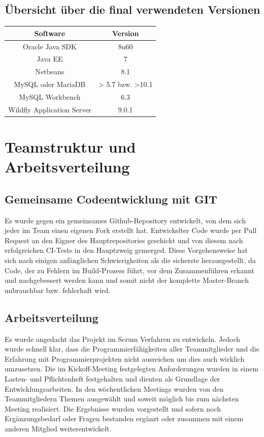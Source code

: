 \documentclass[12pt,a4paper,parskip]{scrreprt}
\begin{document}
\section{Übersicht über die final verwendeten Versionen}
\begin{center}
\begin{tabular}{|c|c|}
\hline
\rule[-1ex]{0pt}{2.5ex} Software & Version  \\ 
\hline 
\rule[-1ex]{0pt}{2.5ex} Oracle Java SDK & 8u60  \\ 
\hline 
\rule[-1ex]{0pt}{2.5ex} Java EE & 7 \\ 
\hline 
\rule[-1ex]{0pt}{2.5ex} Netbeans & 8.1 \\ 
\hline 
\rule[-1ex]{0pt}{2.5ex} MySQL oder MariaDB & > 5.7 bzw. >10.1 \\ 
\hline 
\rule[-1ex]{0pt}{2.5ex} MySQL Workbench & 6.3 \\ 
\hline
\rule[-1ex]{0pt}{2.5ex} Wildfly Application Server & 9.0.1 \\ 
\hline 
\end{tabular}
\end{center}
\chapter{Teamstruktur und Arbeitsverteilung}
\section{Gemeinsame Codeentwicklung mit GIT}
Es wurde gegen ein gemeinsames Github-Repository entwickelt, von dem sich jeder im Team einen eigenen Fork erstellt hat. Entwickelter Code wurde per Pull Request an den Eigner des Hauptrepositories geschickt und von diesem nach erfolgreichen CI-Tests in den Hauptzweig gemerged. Diese Vorgehensweise hat sich nach einigen anfänglichen Schwierigkeiten als die sicherste herausgestellt, da Code, der zu Fehlern im Build-Prozess führt, vor dem Zusammenführen erkannt und nachgebessert werden kann und somit nicht der komplette Master-Branch unbrauchbar bzw. fehlerhaft wird.
\section{Arbeitsverteilung}
Es wurde angedacht das Projekt im Scrum Verfahren zu entwickeln. Jedoch wurde schnell klar, dass die Programmierfähigkeiten aller Teammitglieder und die Erfahrung mit Programmierprojekten nicht ausreichen um dies auch wirklich umzusetzen.
Die im Kickoff-Meeting festgelegten Anforderungen wurden in einem Lasten- und Pflichtenheft festgehalten und dienten als Grundlage der Entwicklungsarbeiten. In den wöchentlichen Meetings wurden von den Teammitgliedern Themen ausgewählt und soweit möglich bis zum nächsten Meeting realisiert. Die Ergebnisse wurden vorgestellt und sofern noch Ergänzungsbedarf oder Fragen bestanden ergänzt oder zusammen mit einem anderen Mitglied weiterentwickelt.
\end{document}
